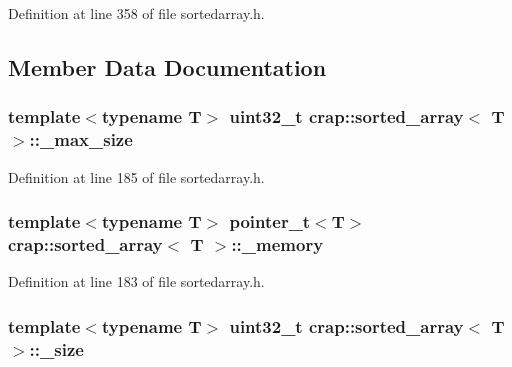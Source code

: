 Definition at line 358 of file sortedarray.\+h.



\subsection{Member Data Documentation}
\hypertarget{classcrap_1_1sorted__array_aea8cbb8c465d41aebecdf939113fa993}{
\subsubsection[{\+\_\+max\+\_\+size}]{\setlength{\rightskip}{0pt plus 5cm}template$<$typename T$>$ uint32\+\_\+t {\bf crap\+::sorted\+\_\+array}$<$ T $>$\+::\+\_\+max\+\_\+size\hspace{0.3cm}{\ttfamily [protected]}}}\label{classcrap_1_1sorted__array_aea8cbb8c465d41aebecdf939113fa993}


Definition at line 185 of file sortedarray.\+h.

\hypertarget{classcrap_1_1sorted__array_afa20ac100c5b603d0a522c94e7cd549f}{
\subsubsection[{\+\_\+memory}]{\setlength{\rightskip}{0pt plus 5cm}template$<$typename T$>$ {\bf pointer\+\_\+t}$<$T$>$ {\bf crap\+::sorted\+\_\+array}$<$ T $>$\+::\+\_\+memory\hspace{0.3cm}{\ttfamily [protected]}}}\label{classcrap_1_1sorted__array_afa20ac100c5b603d0a522c94e7cd549f}


Definition at line 183 of file sortedarray.\+h.

\hypertarget{classcrap_1_1sorted__array_ad33ca1ee9c30abf81658b3c2773ae9d1}{
\subsubsection[{\+\_\+size}]{\setlength{\rightskip}{0pt plus 5cm}template$<$typename T$>$ uint32\+\_\+t {\bf crap\+::sorted\+\_\+array}$<$ T $>$\+::\+\_\+size\hspace{0.3cm}{\ttfamily [protected]}}}\label{classcrap_1_1sorted__array_ad33ca1ee9c30abf81658b3c2773ae9d1}


